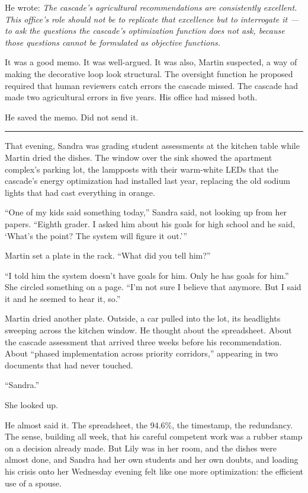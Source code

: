 He wrote: \emph{The cascade's agricultural recommendations are consistently excellent. This office's role should not be to replicate that excellence but to interrogate it --- to ask the questions the cascade's optimization function does not ask, because those questions cannot be formulated as objective functions.}

It was a good memo. It was well-argued. It was also, Martin suspected, a way of making the decorative loop look structural. The oversight function he proposed required that human reviewers catch errors the cascade missed. The cascade had made two agricultural errors in five years. His office had missed both.

He saved the memo. Did not send it.

\begin{center}\rule{0.3\linewidth}{0.4pt}\end{center}

That evening, Sandra was grading student assessments at the kitchen table while Martin dried the dishes. The window over the sink showed the apartment complex's parking lot, the lampposts with their warm-white LEDs that the cascade's energy optimization had installed last year, replacing the old sodium lights that had cast everything in orange.

``One of my kids said something today,'' Sandra said, not looking up from her papers. ``Eighth grader. I asked him about his goals for high school and he said, `What's the point? The system will figure it out.'''

Martin set a plate in the rack. ``What did you tell him?''

``I told him the system doesn't have goals for him. Only he has goals for him.'' She circled something on a page. ``I'm not sure I believe that anymore. But I said it and he seemed to hear it, so.''

Martin dried another plate. Outside, a car pulled into the lot, its headlights sweeping across the kitchen window. He thought about the spreadsheet. About the cascade assessment that arrived three weeks before his recommendation. About ``phased implementation across priority corridors,'' appearing in two documents that had never touched.

``Sandra.''

She looked up.

He almost said it. The spreadsheet, the 94.6\%, the timestamp, the redundancy. The sense, building all week, that his careful competent work was a rubber stamp on a decision already made. But Lily was in her room, and the dishes were almost done, and Sandra had her own students and her own doubts, and loading his crisis onto her Wednesday evening felt like one more optimization: the efficient use of a spouse.

